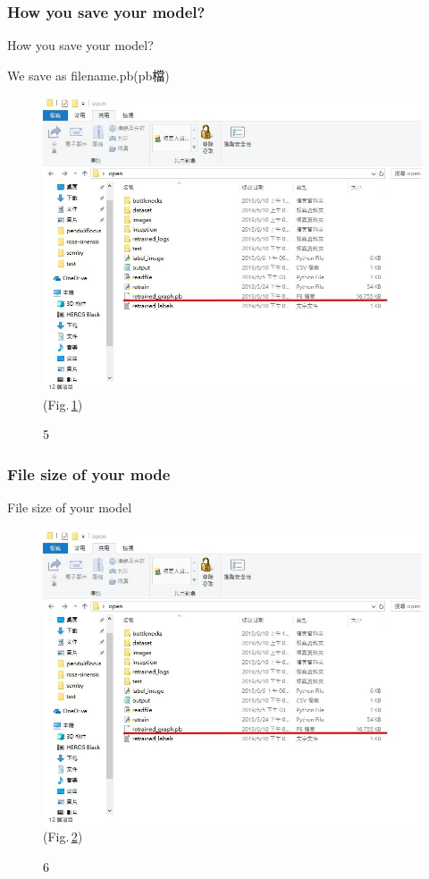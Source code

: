 \documentclass{beamer}
\begin{document}
\subsubsection{How you save your model? }
\begin{frame}{How you save your model? }
  \begin{CJK}{UTF8}{bkai}
	We save as filename.pb(pb檔)
   \end{CJK}
  \begin{figure}
      \includegraphics[width=0.6\linewidth]{pbfile.jpg}(Fig.\,\ref{fig:5})
      \caption{5}
      \label{fig:5}
    \end{figure}
\end{frame}

\subsubsection{File size of your mode }
\begin{frame}{File size of your model }
 \begin{figure}
      \includegraphics[width=0.65\linewidth]{pbfile.jpg}(Fig.\,\ref{fig:6})
      \caption{6}
      \label{fig:6}
    \end{figure}
\end{frame}
\end{document}

